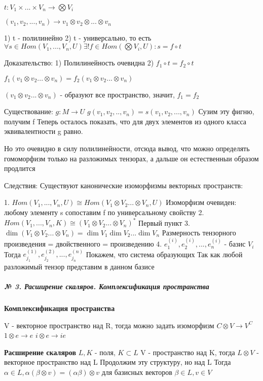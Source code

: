 \documentclass{article}
\begin{document}
\begin{flushleft}

$t : V_1 \times ... \times V_n \rightarrow \bigotimes{V_i}$

$(v_1, v_2, ..., v_n) \rightarrow v_1 \otimes v_2 \otimes ... \otimes v_n$

1) t - полилинейно
2) t - универсально, то есть $\forall s \in Hom(V_1, ..., V_n, U) \exists !f \in Hom(\bigotimes{V_i}, U): s = f \circ t$

Доказательство:
1) Полилинейность очевидна
2) $f_1 \circ t = f_2 \circ t$

$f_1 (v_1 \otimes v_2 ... \otimes v_n) = f_2 (v_1 \otimes v_2 ... \otimes v_n)$

$(v_1 \otimes v_2 ... \otimes v_n)$ - образуют все пространство, значит, $f_1 = f_2$

Существование:
$g : M \rightarrow U$
$g(v_1, v_2, .., v_n) = s(v_1, v_2, ..., v_n)$
Сузим эту фигню, получим f
Теперь осталось показать, что для двух элементов из одного класса эквивалентности g равно.

Но это очевидно в силу полилинейности, отсюда вывод, что можно определять гомоморфизм только на разложимых тензорах, а дальше он естественныи образом продлится

Следствия:
Существуют канонические изоморфизмы векторных пространств:

1. $Hom(V_1, ..., V_n, U) \cong Hom(V_1 \otimes V_2 ... \otimes V_n, U)$
Изоморфизм очевиден: любому элементу s сопоставим f по универсальному свойству
2. $Hom(V_1, ..., V_n, K) \cong (V_1 \otimes V_2 ... \otimes V_n)^*$
Первый пункт
3. $\dim{(V_1 \otimes V_2 ... \otimes V_n)} = \dim{V_1} \dim{V_2} ... \dim{V_n}$
Размерность тензорного произведения = двойственного = произведению
4. $e_1^{(i)}, e_2^{(i)}, ..., e_n^{(i)}$ - базис $V_i$
Тогда $e_{j_1}^{(1)}, e_{j_2}^{(2)}, ..., e_{j_n}^{(n)}$
Покажем, что система образующих
Так как любой разложимый тензор представим в данном базисе

\end{flushleft}

\subparagraph{\tiny № 3. Расширение скаляров. Комплексификация пространства}

\begin{flushleft}

\textbf{Комплексификация пространства}

V - векторное пространство над R, тогда можно задать изоморфизм $C \otimes V \rightarrow V^C$
$1 \otimes e \rightarrow e$
$i \otimes e \rightarrow ie$

\textbf{Расширение скаляров}
$L, K$ - поля, $K \subset L$
V - пространство над K, тогда $L \otimes V$ - векторное пространство над L
Продолжим эту структуру, но над L
Тогда $\alpha \in L, \alpha (\beta \otimes v) = (\alpha \beta) \otimes v$ для базисных векторов $\beta \in L, v \in V$

\end{flushleft}
\end{document}
